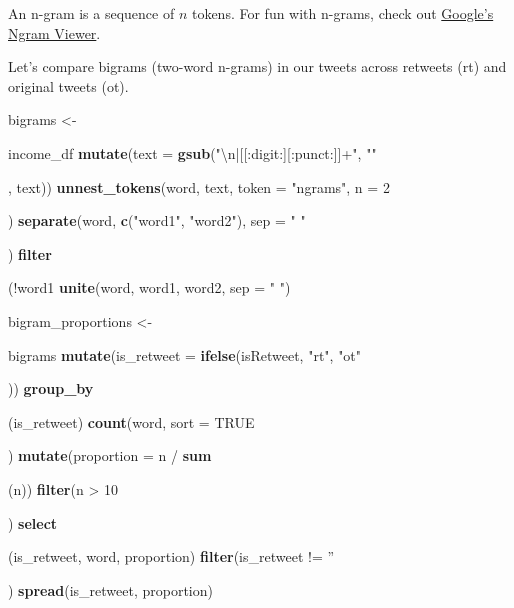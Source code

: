 \documentclass[]{book}
\newenvironment{Shaded}{\begin{snugshade}}{\end{snugshade}}
\newcommand{\KeywordTok}[1]{\textcolor[rgb]{0.13,0.29,0.53}{\textbf{{#1}}}}
\newcommand{\DataTypeTok}[1]{\textcolor[rgb]{0.13,0.29,0.53}{{#1}}}
\newcommand{\DecValTok}[1]{\textcolor[rgb]{0.00,0.00,0.81}{{#1}}}
\newcommand{\CharTok}[1]{\textcolor[rgb]{0.31,0.60,0.02}{{#1}}}
\newcommand{\StringTok}[1]{\textcolor[rgb]{0.31,0.60,0.02}{{#1}}}
\newcommand{\OtherTok}[1]{\textcolor[rgb]{0.56,0.35,0.01}{{#1}}}
\newcommand{\NormalTok}[1]{{#1}}
\theoremstyle{definition}
\theoremstyle{definition}
\theoremstyle{remark}
\begin{document}
An n-gram is a sequence of \(n\) tokens. For fun with n-grams, check out
\href{https://books.google.com/ngrams}{Google's Ngram Viewer}.

Let's compare bigrams (two-word n-grams) in our tweets across retweets
(rt) and original tweets (ot).

\begin{Shaded}
\begin{Highlighting}[]
\NormalTok{bigrams <-}\StringTok{ }\NormalTok{income_df %
\StringTok{  }\KeywordTok{mutate}\NormalTok{(}\DataTypeTok{text =} \KeywordTok{gsub}\NormalTok{(}\StringTok{"}\CharTok{\textbackslash{}n}\StringTok{|[[:digit:][:punct:]]+"}\NormalTok{, }\StringTok{""}\NormalTok{, text)) %
\StringTok{  }\KeywordTok{unnest_tokens}\NormalTok{(word, text, }\DataTypeTok{token =} \StringTok{"ngrams"}\NormalTok{, }\DataTypeTok{n =} \DecValTok{2}\NormalTok{) %
\StringTok{  }\KeywordTok{separate}\NormalTok{(word, }\KeywordTok{c}\NormalTok{(}\StringTok{"word1"}\NormalTok{, }\StringTok{"word2"}\NormalTok{), }\DataTypeTok{sep =} \StringTok{" "}\NormalTok{) %
\StringTok{  }\KeywordTok{filter}\NormalTok{(!word1 %
\StringTok{  }\KeywordTok{unite}\NormalTok{(word, word1, word2, }\DataTypeTok{sep =} \StringTok{" "}\NormalTok{)}

\NormalTok{bigram_proportions <-}\StringTok{ }\NormalTok{bigrams %
\StringTok{  }\KeywordTok{mutate}\NormalTok{(}\DataTypeTok{is_retweet =} \KeywordTok{ifelse}\NormalTok{(isRetweet, }\StringTok{"rt"}\NormalTok{, }\StringTok{"ot"}\NormalTok{)) %
\StringTok{  }\KeywordTok{group_by}\NormalTok{(is_retweet) %
\StringTok{  }\KeywordTok{count}\NormalTok{(word, }\DataTypeTok{sort =} \OtherTok{TRUE}\NormalTok{) %
\StringTok{  }\KeywordTok{mutate}\NormalTok{(}\DataTypeTok{proportion =} \NormalTok{n /}\StringTok{ }\KeywordTok{sum}\NormalTok{(n)) %
\StringTok{  }\KeywordTok{filter}\NormalTok{(n >}\StringTok{ }\DecValTok{10}\NormalTok{) %
\StringTok{  }\KeywordTok{select}\NormalTok{(is_retweet, word, proportion) %
\StringTok{  }\KeywordTok{filter}\NormalTok{(is_retweet !=}\StringTok{ ''}\NormalTok{) %
\StringTok{  }\KeywordTok{spread}\NormalTok{(is_retweet, proportion)}

}}}}}}}}}}}}}
\end{Highlighting}
\end{Shaded}
\end{document}
